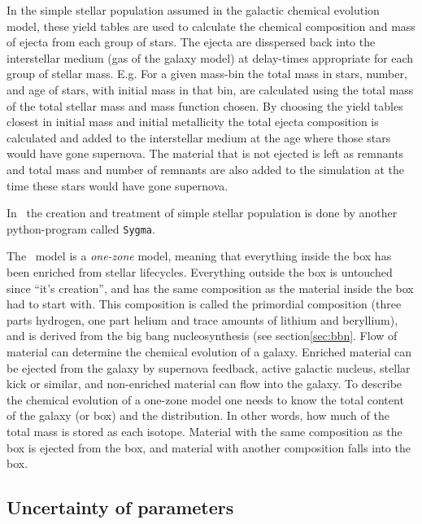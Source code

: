 In the simple stellar population assumed in the galactic chemical evolution model, these yield tables are used to calculate the chemical composition and mass of ejecta from each group of stars. The ejecta are disspersed back into the interstellar medium (gas of the galaxy model) at delay-times appropriate for each group of stellar mass.
E.g. For a given mass-bin the total mass in stars, number, and age of stars, with initial mass in that bin, are calculated using the total mass of the total stellar mass and mass function chosen. By choosing the yield tables closest in initial mass and initial metallicity the total ejecta composition is calculated and added to the interstellar medium at the age where those stars would have gone supernova.
The material that is not ejected is left as remnants and total mass and number of remnants are also added to the simulation at the time these stars would have gone supernova.

In \omegamodel\ the creation and treatment of simple stellar population is done by another python-program called \texttt{Sygma}.

The \omegamodel\ model is a \textit{one-zone} model, meaning that everything inside the box has been enriched from stellar lifecycles. Everything outside the box is untouched since ``it's creation'', and has the same composition as the material inside the box had to start with.
This composition is called the primordial composition (three parts hydrogen, one part helium and trace amounts of lithium and beryllium), and is derived from the big bang nucleosynthesis (see section\ref{sec:bbn}.
Flow of material can determine the chemical evolution of a galaxy. Enriched material can be ejected from the galaxy by supernova feedback, active galactic nucleus, stellar kick or similar, and non-enriched material can flow into the galaxy.
To describe the chemical evolution of a one-zone model one needs to know the total content of the galaxy (or box) and the distribution. In other words, how much of the total mass is stored as each isotope. Material with the same composition as the box is ejected from the box, and material with another composition falls into the box.

\begin{figure}[h]
  
\end{figure}
\FloatBarrier

\subsection{Uncertainty of parameters}
\nopagebreak


